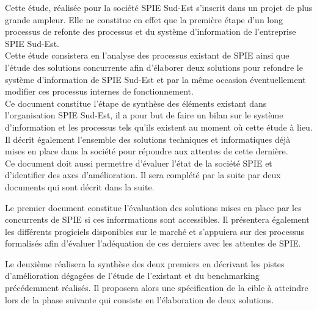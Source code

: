 Cette étude, réalisée pour la société SPIE Sud-Est s'inscrit dans un projet de plus grande ampleur. Elle ne constitue en effet que la première étape d'un long processus de refonte des processus et du système d'information de l'entreprise SPIE Sud-Est. \\

Cette étude consistera en l'analyse des processus existant de SPIE ainsi que l'étude des solutions concurrente afin d'élaborer deux solutions pour refondre le système d'information de SPIE Sud-Est et par la même occasion éventuellement modifier ces processus internes de fonctionnement. \\

Ce document constitue l'étape de synthèse des éléments existant dans l'organisation SPIE Sud-Est, il a pour but de faire un bilan sur le système d'information et les processus tels qu'ils existent au moment où cette étude à lieu. Il décrit également l'ensemble des solutions techniques et informatiques déjà mises en place dans la société pour répondre aux attentes de cette dernière. \\

Ce document doit aussi permettre d'évaluer l'état de la société SPIE et d'identifier des axes d'amélioration. Il sera complété par la suite par deux documents qui sont décrit dans la suite.

Le premier document constitue l'évaluation des solutions mises en place par les concurrents de SPIE si ces inforrmations sont accessibles. Il présentera également les différents progiciels disponibles sur le marché et s'appuiera sur des processus formalisés afin d'évaluer l'adéquation de ces derniers avec les attentes de SPIE.

Le deuxième réalisera la synthèse des deux premiers en décrivant les pistes d'amélioration dégagées de l'étude de l'existant et du benchmarking précédemment réalisés. Il proposera alors une spécification de la cible à atteindre lors de la phase suivante qui consiste en l'élaboration de deux solutions. 